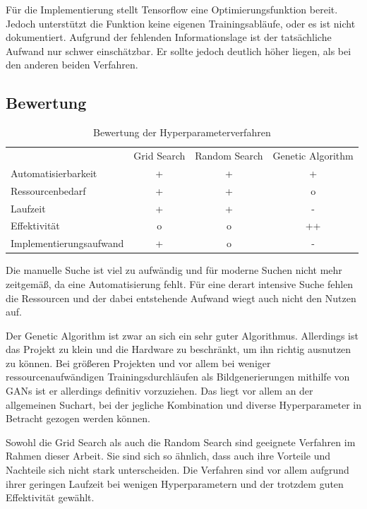 Für die Implementierung stellt Tensorflow eine Optimierungsfunktion bereit.
Jedoch unterstützt die Funktion keine eigenen Trainingsabläufe, oder es ist nicht dokumentiert.
Aufgrund der fehlenden Informationslage ist der tatsächliche Aufwand nur schwer einschätzbar. %
Er sollte jedoch deutlich höher liegen, als bei den anderen beiden Verfahren.

\subsection{Bewertung}

\begin{table}[H]
	\centering
	\begin{tabular}{l|c|c|c}
		                        & Grid Search & Random Search & Genetic Algorithm \\
		Automatisierbarkeit     &      +      &       +       &         +         \\
		Ressourcenbedarf        &      +      &       +       &         o         \\
		Laufzeit                &      +      &       +       &         -         \\
		Effektivität            &      o      &       o       &        ++         \\
		Implementierungsaufwand &      +      &       o       &         -
	\end{tabular}
	\caption{Bewertung der Hyperparameterverfahren}
\end{table}


Die manuelle Suche ist viel zu aufwändig und für moderne Suchen nicht mehr zeitgemäß, da eine Automatisierung fehlt.
Für eine derart intensive Suche fehlen die Ressourcen und der dabei entstehende Aufwand wiegt auch nicht den Nutzen auf.
\newline

Der Genetic Algorithm ist zwar an sich ein sehr guter Algorithmus.
Allerdings ist das Projekt zu klein und die Hardware zu beschränkt, um ihn richtig ausnutzen zu können.
Bei größeren Projekten und vor allem bei weniger ressourcenaufwändigen Trainingsdurchläufen als Bildgenerierungen mithilfe von GANs ist er allerdings definitiv vorzuziehen.
Das liegt vor allem an der allgemeinen Suchart, bei der jegliche Kombination und diverse Hyperparameter in Betracht gezogen werden können.
\newline

Sowohl die Grid Search als auch die Random Search sind geeignete Verfahren im Rahmen dieser Arbeit.
Sie sind sich so ähnlich, dass auch ihre Vorteile und Nachteile sich nicht stark unterscheiden.
Die Verfahren sind vor allem aufgrund ihrer geringen Laufzeit bei wenigen Hyperparametern und der trotzdem guten Effektivität gewählt.

